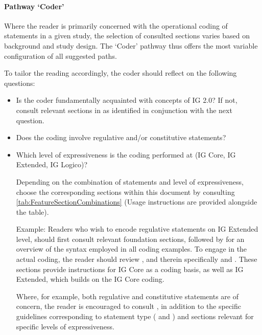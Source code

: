 \paragraph{Pathway `Coder'}

Where the reader is primarily concerned with the operational coding of statements in a given study, the selection of consulted sections varies based on background and study design. The `Coder' pathway thus offers the most variable configuration of all suggested paths.

To tailor the reading accordingly, the coder should reflect on the following questions:

\begin{itemize}
\item Is the coder fundamentally acquainted with concepts of IG 2.0? If not, consult relevant sections in  as identified in conjunction with the next question.

\item Does the coding involve regulative and/or constitutive statements? 

\item Which level of expressiveness is the coding performed at (IG Core, IG Extended, IG Logico)?

Depending on the combination of statements and level of expressiveness, choose the corresponding sections within this document by consulting \cref{tab:FeatureSectionCombinations} (Usage instructions are provided alongside the table). 

Example: Readers who wish to encode regulative statements on IG Extended level, should first consult relevant foundation sections, followed by  for an overview of the syntax employed in all coding examples. To engage in the actual coding, the reader should review , and therein specifically  and . These sections provide instructions for IG Core as a coding basis, as well as IG Extended, which builds on the IG Core coding. 


Where, for example, both regulative and constitutive statements are of concern, the reader is encouraged to consult , in addition to the specific guidelines corresponding to statement type ( and ) and sections relevant for specific levels of expressiveness. 


\end{itemize}
